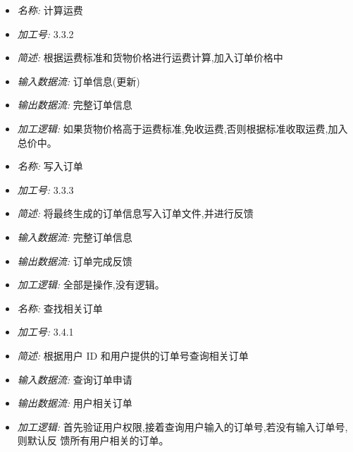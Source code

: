 \documentclass{article}
\begin{document}
\begin{CJK*}{UTF8}{gbsn}
\begin{itemize}
\end{itemize}


\vspace{-1mm}


\begin{itemize}
\item \textit{名称: }计算运费
\item \textit{加工号: }3.3.2
\item \textit{简述: }根据运费标准和货物价格进行运费计算,加入订单价格中 
\item \textit{输入数据流: }订单信息(更新)
\item \textit{输出数据流: }完整订单信息 
\item \textit{加工逻辑: }如果货物价格高于运费标准,免收运费,否则根据标准收取运费,加入总价中。

\end{itemize}


\vspace{-1mm}


\begin{itemize}
\item \textit{名称: }写入订单
\item \textit{加工号: }3.3.3 
\item \textit{简述: }将最终生成的订单信息写入订单文件,并进行反馈 
\item \textit{输入数据流: }完整订单信息
\item \textit{输出数据流: }订单完成反馈
\item \textit{加工逻辑: }全部是操作,没有逻辑。

\end{itemize}


\vspace{-1mm}


\begin{itemize}
\item \textit{名称: }查找相关订单
\item \textit{加工号: }3.4.1
\item \textit{简述: }根据用户 ID 和用户提供的订单号查询相关订单
\item \textit{输入数据流: }查询订单申请
\item \textit{输出数据流: }用户相关订单 
\item \textit{加工逻辑: }首先验证用户权限,接着查询用户输入的订单号,若没有输入订单号,则默认反 馈所有用户相关的订单。

\end{itemize}


\vspace{-1mm}



\end{CJK*}
\end{document}
